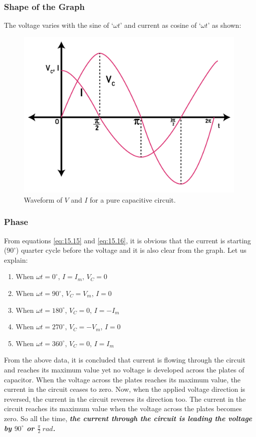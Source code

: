 \subsubsection{Shape of the Graph}
The voltage varies with the sine of ‘$\omega t$’ and current as
cosine of ‘$\omega t$’ as shown:
\begin{figure}[H]
    \centering
    \includegraphics[]{Images/Chapter-15/15.12}
    \caption{Waveform of $V$ and $I$ for a pure capacitive circuit.}
    \label{fig:15.12}
\end{figure}
\subsubsection{Phase}
From equations \ref{eq:15.15} and \ref{eq:15.16},
it is obvious that the current is starting
($90^{\circ}$) quarter cycle before the voltage and
it is also clear from the graph. 
\newline
Let us explain:
\begin{enumerate}[label = $\square$]
    \item When $\omega t = 0^{\circ}$, $I=I_{m}$, $V_{C}=0$
    \item When $\omega t = 90^{\circ}$, $V_{C}=V_{m}$, $I=0$
    \item When $\omega t = 180^{\circ}$, $V_{C}=0$, $I=-I_{m}$
    \item When $\omega t = 270^{\circ}$, $V_{C}=-V_{m}$, $I = 0$
    \item When $\omega t =360^{\circ}$, $V_{C}=0$, $I=I_{m}$
\end{enumerate}
From the above data, it is concluded that current is flowing through
the circuit and reaches its maximum value yet no voltage is developed
across the plates of capacitor. When the voltage across the plates
reaches its maximum value, the current in the circuit ceases to zero.
Now, when the applied voltage direction is reversed, the current in
the circuit reverses its direction too. The current in the circuit
reaches its maximum value when the voltage across the plates becomes zero.
So all the time, \textit{\textbf{the current through the circuit is
leading the voltage by $90^{\circ}$ or $\frac{\pi}{2}\:rad$.}}

